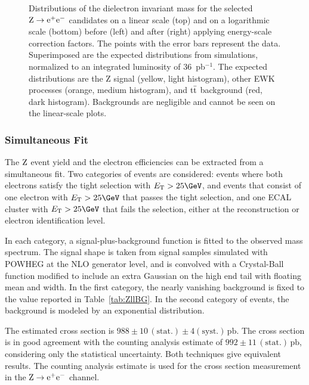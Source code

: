 \begin{figure}
\begin{center}
   \caption{ \label{fig:Zee}
Distributions of the dielectron invariant mass for the selected $\mathrm{Z} \rightarrow \mathrm{e}^+\mathrm{e}^-$ candidates on
a linear scale (top) and on a logarithmic scale (bottom) before (left)
and after (right) applying energy-scale correction factors.
The points with the error bars represent the data.
Superimposed are the expected distributions from simulations, normalized
to an integrated luminosity of $36$~pb$^{-1}$. The expected distributions are
the Z signal (yellow, light histogram), other EWK processes (orange, medium histogram),
and $\mathrm{t}\bar{\mathrm{t}}$ background (red, dark histogram).
Backgrounds are negligible and cannot be seen on the linear-scale plots.
}
  \end{center}
\end{figure}


\subsubsection{Simultaneous Fit}

The $\mathrm{Z}$ event yield and the electron efficiencies can be extracted from
a simultaneous fit. Two categories of events are
considered: events where both electrons satisfy
the tight selection with $\Et>25\GeV$, and events that consist of
one electron with $\Et>25\GeV$ that passes the tight selection, and one
ECAL cluster with $\Et>25\GeV$ that fails
the selection, either at the reconstruction or electron identification level.

In each category, a signal-plus-background function is fitted to the observed mass spectrum.
The signal shape is taken from signal samples simulated with POWHEG at the NLO generator level,
and is convolved with a Crystal-Ball function modified to include an extra
Gaussian on the high end tail with floating mean and width.
In the first category, the nearly vanishing background is fixed to the
value reported in Table~\ref{tab:ZllBG}. In the second
category of events, the background is modeled by an exponential distribution.

The estimated cross section is $988 \pm 10\, \mathrm{(stat.)} \pm 4\mathrm{(syst.)}\,\mathrm{pb}$.
The cross section is in good agreement with the counting analysis estimate of
 $992 \pm 11\, \mathrm{(stat.)}\,\mathrm{pb}$, considering only the statistical uncertainty.
Both techniques give equivalent results. The counting analysis estimate is used for the
cross section measurement in the $\mathrm{Z} \rightarrow \mathrm{e}^+\mathrm{e}^-$ channel.

